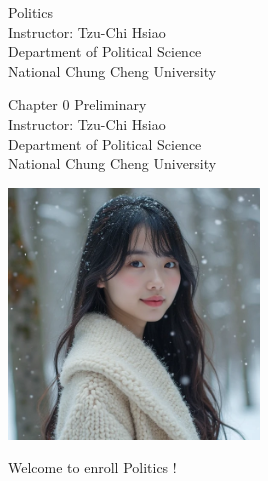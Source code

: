 \documentclass{beamer}
\title{}
\author{}
\date{}
\begin{document}
\begin{frame}
\begin{center}
\Large{Politics} \\
\vspace{3em}
\normalsize{Instructor: Tzu-Chi Hsiao} \\
\vspace{3em}
\small{Department of Political Science} \\
\vspace{1em}
\small{National Chung Cheng University}
\end{center}
\end{frame}
\begin{frame}
\begin{center}
\Large{Chapter 0 Preliminary} \\
\vspace{3em}
\normalsize{Instructor: Tzu-Chi Hsiao} \\
\vspace{3em}
\small{Department of Political Science} \\
\vspace{1em}
\small{National Chung Cheng University} \\
\end{center}
\end{frame}
\begin{frame}{}
\begin{center}
\includegraphics[width=0.5\textwidth]{instructor.png}
\end{center}
\vspace{1em}
\begin{center}
\Large{Welcome to enroll Politics !} \\
\end{center}
\end{frame}
\end{document}
